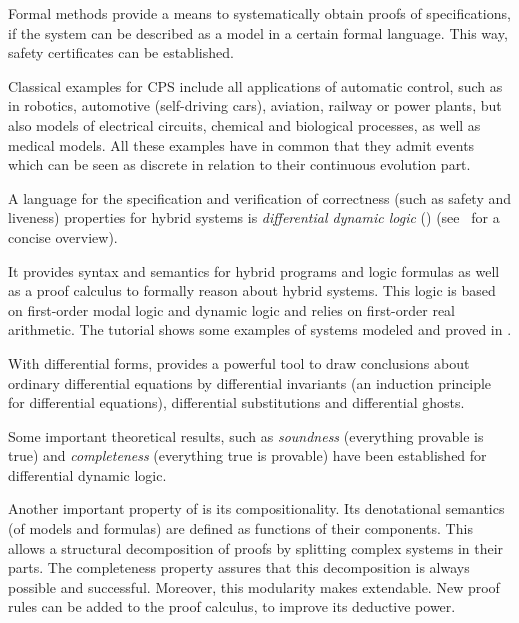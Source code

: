     Formal methods provide a means to systematically obtain proofs of specifications, if the system can be described as a model in a certain formal language.
    This way, safety certificates can be established.

    
    Classical examples for CPS include all applications of automatic control, such as in robotics, automotive (self-driving cars), aviation, railway or power plants, but also models of electrical circuits, chemical and biological processes, as well as medical models.
    All these examples have in common that they admit events which can be seen as discrete in relation to their continuous evolution part.

    A language for the specification and verification of correctness (such as safety and liveness) properties for hybrid systems is \emph{differential dynamic logic} (\dL) (see~\cite{Platzer12LogicsDynSys} for a concise overview).

    It provides syntax and semantics for hybrid programs and logic formulas as well as a proof calculus to formally reason about hybrid systems.
    This logic is based on first-order modal logic and dynamic logic and relies on first-order real arithmetic.
    The tutorial \cite{Quesel16Tutorial} shows some examples of systems modeled and proved in \dL.

    
    With differential forms, \dL provides a powerful tool to draw conclusions about ordinary differential equations by differential invariants (an induction principle for differential equations), differential substitutions and differential ghosts.    

    Some important theoretical results, such as \emph{soundness} (everything provable is true) and \emph{completeness} (everything true is provable) have been established for differential dynamic logic.

    Another important property of \dL is its compositionality.
    Its denotational semantics (of models and formulas) are defined as functions of their components.
    This allows a structural decomposition of proofs by splitting complex systems in their parts.
    The completeness property assures that this decomposition is always possible and successful.
    Moreover, this modularity makes \dL extendable. New proof rules can be added to the proof calculus, to improve its deductive power.

